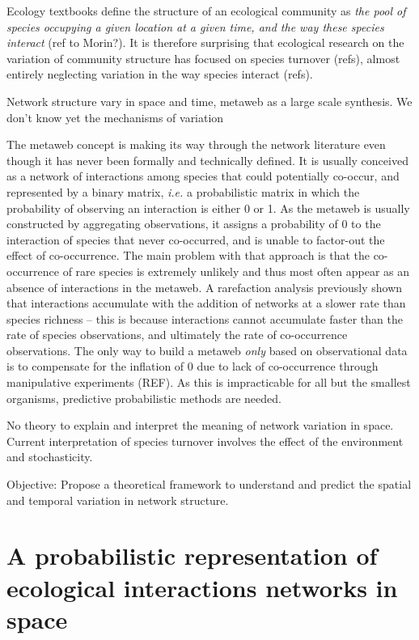 \documentclass[12pt]{article}
\begin{document}
Ecology textbooks define the structure of an ecological community as
\emph{the pool of species occupying a given location at a given time, and
the way these species interact} (ref to Morin?). It is therefore surprising
that ecological research on the variation of community structure has focused
on species turnover (refs), almost entirely neglecting variation in the way
species interact (refs).

Network structure vary in space and time, metaweb as a large scale
synthesis. We don't know yet the mechanisms of variation

The metaweb concept is making its way through the network literature even
though it has never been formally and technically defined.
It is usually conceived as a network of interactions among species that
could potentially co-occur, and represented by a binary matrix, \emph{i.e.}
a probabilistic matrix in which the probability of observing an interaction
is either 0 or 1. As the metaweb is usually constructed by aggregating
observations, it assigns a probability of 0 to the interaction of species that
never co-occurred, and is unable to factor-out the effect of co-occurrence. The
main problem with that approach is that the co-occurrence of rare species is
extremely unlikely and thus most often appear as an absence of interactions
in the metaweb. A rarefaction analysis previously shown that interactions
accumulate with the addition of networks at a slower rate than species richness
\parencite{Poisot2012d} -- this is because interactions cannot accumulate
faster than the rate of species observations, and ultimately the rate of
co-occurrence observations. The only way to build a metaweb \emph{only}
based on observational data is to compensate for the inflation of 0 due
to lack of co-occurrence through manipulative experiments (REF). As this is
impracticable for all but the smallest organisms, predictive probabilistic
methods are needed.

No theory to explain and interpret the meaning of network variation in space.
Current interpretation of species turnover involves the effect of the
environment and stochasticity.

Objective: Propose a theoretical framework to understand and predict the
spatial and temporal variation in network structure.

\newpage
\section*{A probabilistic representation of ecological interactions networks in space}
\end{document}
